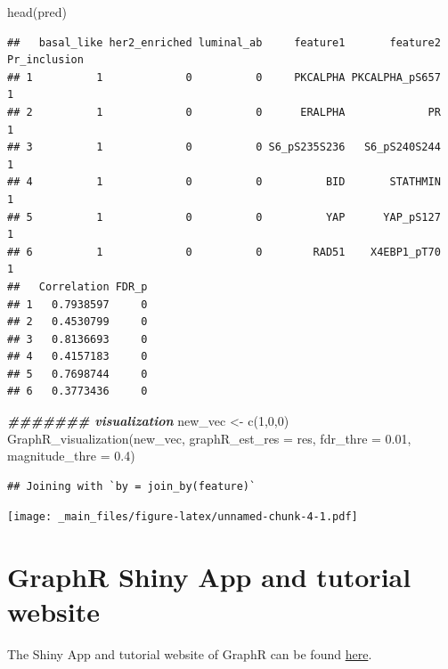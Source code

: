 \documentclass[
]{book}
\newenvironment{Shaded}{\begin{snugshade}}{\end{snugshade}}
\newcommand{\AttributeTok}[1]{\textcolor[rgb]{0.77,0.63,0.00}{#1}}
\newcommand{\DecValTok}[1]{\textcolor[rgb]{0.00,0.00,0.81}{#1}}
\newcommand{\DocumentationTok}[1]{\textcolor[rgb]{0.56,0.35,0.01}{\textbf{\textit{#1}}}}
\newcommand{\FloatTok}[1]{\textcolor[rgb]{0.00,0.00,0.81}{#1}}
\newcommand{\FunctionTok}[1]{\textcolor[rgb]{0.00,0.00,0.00}{#1}}
\newcommand{\NormalTok}[1]{#1}
\newcommand{\OtherTok}[1]{\textcolor[rgb]{0.56,0.35,0.01}{#1}}
\begin{document}
\begin{Shaded}
\begin{Highlighting}[]
\FunctionTok{head}\NormalTok{(pred)}
\end{Highlighting}
\end{Shaded}

\begin{verbatim}
##   basal_like her2_enriched luminal_ab     feature1       feature2 Pr_inclusion
## 1          1             0          0     PKCALPHA PKCALPHA_pS657            1
## 2          1             0          0      ERALPHA             PR            1
## 3          1             0          0 S6_pS235S236   S6_pS240S244            1
## 4          1             0          0          BID       STATHMIN            1
## 5          1             0          0          YAP      YAP_pS127            1
## 6          1             0          0        RAD51    X4EBP1_pT70            1
##   Correlation FDR_p
## 1   0.7938597     0
## 2   0.4530799     0
## 3   0.8136693     0
## 4   0.4157183     0
## 5   0.7698744     0
## 6   0.3773436     0
\end{verbatim}

\begin{Shaded}
\begin{Highlighting}[]
\DocumentationTok{\#\#\#\#\#\#\# visualization}
\NormalTok{new\_vec }\OtherTok{\textless{}{-}} \FunctionTok{c}\NormalTok{(}\DecValTok{1}\NormalTok{,}\DecValTok{0}\NormalTok{,}\DecValTok{0}\NormalTok{)}
\FunctionTok{GraphR\_visualization}\NormalTok{(new\_vec, }\AttributeTok{graphR\_est\_res =}\NormalTok{ res,}
                     \AttributeTok{fdr\_thre =} \FloatTok{0.01}\NormalTok{, }\AttributeTok{magnitude\_thre =} \FloatTok{0.4}\NormalTok{)}
\end{Highlighting}
\end{Shaded}

\begin{verbatim}
## Joining with `by = join_by(feature)`
\end{verbatim}

\texttt{[image: \_main\_files/figure-latex/unnamed-chunk-4-1.pdf]}

\hypertarget{GraphRshinyApp}{%
\section{GraphR Shiny App and tutorial website}\label{GraphRshinyApp}}

The Shiny App and tutorial website of GraphR can be found \href{https://bayesrx.shinyapps.io/GraphR/}{here}.
\end{document}
